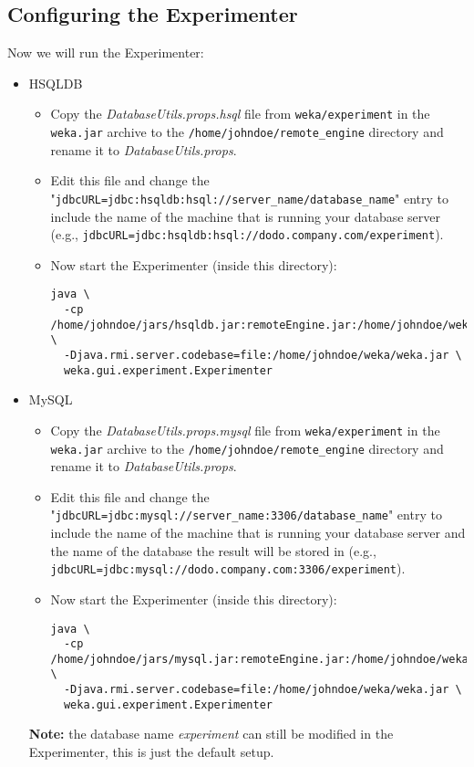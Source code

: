 \documentclass[a4paper]{article}
\begin{document}
\subsection{Configuring the Experimenter}

Now we will run the Experimenter:

\begin{itemize}
	\item HSQLDB
		\begin{itemize}
   		\item Copy the \textit{DatabaseUtils.props.hsql} file from \texttt{weka/experiment} in the \texttt{weka.jar} archive to the \texttt{/home/johndoe/remote\_engine} directory and rename it to \textit{DatabaseUtils.props}.
		   \item Edit this file and change the "\small{\texttt{jdbcURL=jdbc:hsqldb:hsql://server\_name/database\_name}}" entry to include the name of the machine that is running your database server (e.g., \small{\texttt{jdbcURL=jdbc:hsqldb:hsql://dodo.company.com/experiment}}).
		   \item Now start the Experimenter (inside this directory): 
				\small{\begin{verbatim}
java \
  -cp /home/johndoe/jars/hsqldb.jar:remoteEngine.jar:/home/johndoe/weka/weka.jar \
  -Djava.rmi.server.codebase=file:/home/johndoe/weka/weka.jar \
  weka.gui.experiment.Experimenter
				\end{verbatim}}
		\end{itemize}

	\item MySQL
		\begin{itemize}
   		\item Copy the \textit{DatabaseUtils.props.mysql} file from \texttt{weka/experiment} in the \texttt{weka.jar} archive to the \texttt{/home/johndoe/remote\_engine} directory and rename it to \textit{DatabaseUtils.props}.
		   \item Edit this file and change the "\small{\texttt{jdbcURL=jdbc:mysql://server\_name:3306/database\_name}}" entry to include the name of the machine that is running your database server and the name of the database the result will be stored in (e.g., \small{\texttt{jdbcURL=jdbc:mysql://dodo.company.com:3306/experiment}}). 
		   \item Now start the Experimenter (inside this directory): 
				\small{\begin{verbatim}
java \
  -cp /home/johndoe/jars/mysql.jar:remoteEngine.jar:/home/johndoe/weka/weka.jar \
  -Djava.rmi.server.codebase=file:/home/johndoe/weka/weka.jar \
  weka.gui.experiment.Experimenter
				\end{verbatim}}
		\end{itemize}
		
		\textbf{Note:} the database name \textit{experiment} can still be modified in the Experimenter, this is just the default setup.
\end{itemize}
\end{document}
